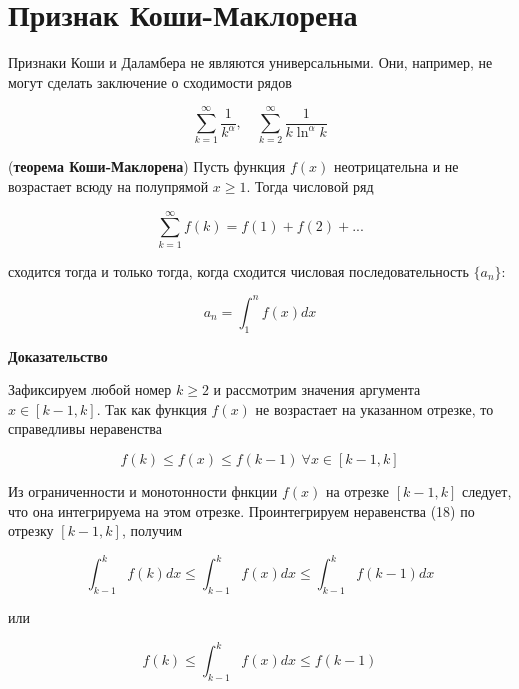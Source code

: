 \section{Признак Коши-Маклорена}

Признаки Коши и Даламбера не являются универсальными. Они, например, не могут сделать заключение о сходимости рядов

\begin{equation*}
	\displaystyle\sum_{k = 1}^\infty \frac{1}{k^\alpha},\quad \displaystyle\sum_{k = 2}^\infty \frac{1}{k\ln^\alpha k}
\end{equation*}

\begin{theorem}
	(\textbf{теорема Коши-Маклорена}) Пусть функция $f(x)$ неотрицательна и не возрастает всюду на полупрямой $x \geqslant  1$. Тогда числовой ряд
	
	\begin{equation}
		\displaystyle\sum_{k = 1}^\infty f(k) = f(1) + f(2) + ...
	\end{equation}
	
	сходится тогда и только тогда, когда сходится числовая последовательность $\{a_n\}$:
	
	\begin{equation}
		a_n = \displaystyle\int_{1}^n f(x)dx
	\end{equation}
\end{theorem}

\textbf{Доказательство}

Зафиксируем любой номер $k \geqslant 2$ и рассмотрим значения аргумента $x \in [k - 1, k]$. Так как функция $f(x)$ не возрастает на указанном отрезке, то справедливы неравенства

\begin{equation}
	f(k) \leqslant f(x) \leqslant f(k - 1)\ \forall x\in [k - 1, k]
\end{equation}

Из ограниченности и монотонности фнкции $f(x)$ на отрезке $[k - 1, k]$ следует, что она интегрируема на этом отрезке. Проинтегрируем неравенства (18)  по отрезку  $[k - 1, k]$, получим

\begin{equation*}
	\displaystyle\int_{k  -1}^k f(k)dx \leqslant \displaystyle\int_{k  -1}^k f(x)dx \leqslant \displaystyle\int_{k  -1}^k f(k - 1)dx
\end{equation*}

или

\begin{equation*}
	f(k) \leqslant \displaystyle\int_{k - 1}^k f(x)dx \leqslant f(k - 1)
\end{equation*}

